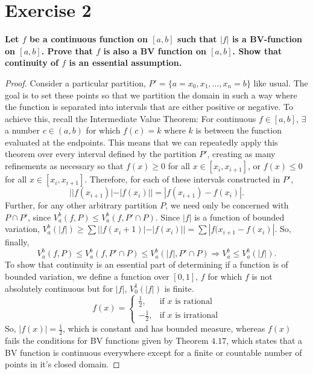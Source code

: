 \documentclass[paper=a4, fontsize=11pt]{scrartcl} %
\begin{document}
\section*{Exercise 2}
\boldmath
\textbf{Let $f$ be a continuous function on $[a, b]$ such that $|f|$ is a
BV-function on $[a, b]$.  Prove that $f$ is also a BV function on $[a,
b]$.  Show that continuity of $f$ is an essential assumption.}
\unboldmath
\begin{proof}
Consider a particular partition, $P' = \{a = x_0, x_1, \dots , x_n = b \}$ like usual.  The goal is to set these points so that we partition the domain in such a way where
the function is separated into intervals that are either positive or negative.
To achieve this, recall the Intermediate Value Theorem:
\newline
For continuous $f \in [a, b]$, $\exists$ a number $c \in (a, b)$ for which $f(c) = k$ where $k$ is between the function evaluated at the endpoints.  
\newline
This means that we can repeatedly apply this theorem over every interval defined by the partition $P'$, creating as many refinements as necessary so that $f(x) \geq 0 $ for all $x \in [x_i, x_{i+1}]$, or $f(x) \leq 0$ for all $x \in [x_i, x_{i+1}]$.
\newline
Therefore, for each of these intervals constructed in $P'$, 
$$||f(x_{i+1})| - |f(x_i)|| = |f(x_{i+1}) - f(x_i)|.$$
Further, for any other arbitrary partition $P$, we need only be concerned with $P \cap P'$, since $V_{a}^{b}(f, P) \leq V_{a}^{b}(f, P' \cap P).$
\newline
Since $|f|$ is a function of bounded variation, $V_{a}^{b}(|f|) \geq \sum ||f(x_i+1)| - |f(x_i)|| = \sum|f(x_{i+1} - f(x_i)|.$  So, finally,
$$V_{a}^{b}(f, P) \leq V_{a}^{b}(f, P' \cap P) \leq V_{a}^{b}(|f|, P' \cap P) \Rightarrow V_{a}^{b} \leq V_{a}^{b}(|f|).$$
\newline
To show that continuity is an essential part of determining if a function is of bounded variation, we define a function over $[0, 1]$, $f$ for which $f$ is not absolutely continuous but for $|f|$, $V_{0}^{1}(|f|)$ is finite.
\newline
$$
f(x) =
\begin{cases}
\frac{1}{2}, & \text{if }x \text{ is rational} \\
-\frac{1}{2}, & \text{if }x\text{ is irrational}
\end{cases}
$$
So, $|f(x)| = \frac{1}{2}$, which is constant and has bounded measure, whereas $f(x)$ fails the conditions for BV functions given by Theorem $4.17$, which states that a BV function is continuous everywhere except for a finite or countable number of points in it's closed domain.
\end{proof}
\end{document}
